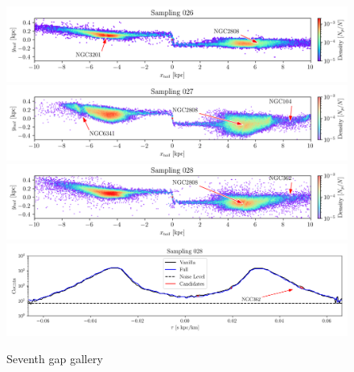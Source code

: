 \documentclass[draft]{aa}
\begin{document}
\begin{appendix}
    \begin{figure}
      \centering
      \includegraphics[width=\linewidth]{gallery_of_gaps_monte-carlo-026.png}
      \includegraphics[width=\linewidth]{gallery_of_gaps_monte-carlo-027.png}
      \includegraphics[width=\linewidth]{gallery_of_gaps_monte-carlo-028.png}
      \includegraphics[width=\linewidth]{tau-profile-monte-carlo-028.png}
      \caption{Seventh gap gallery}
      \label{fig:gallery6}
      \end{figure}        


\end{appendix}
\end{document}
